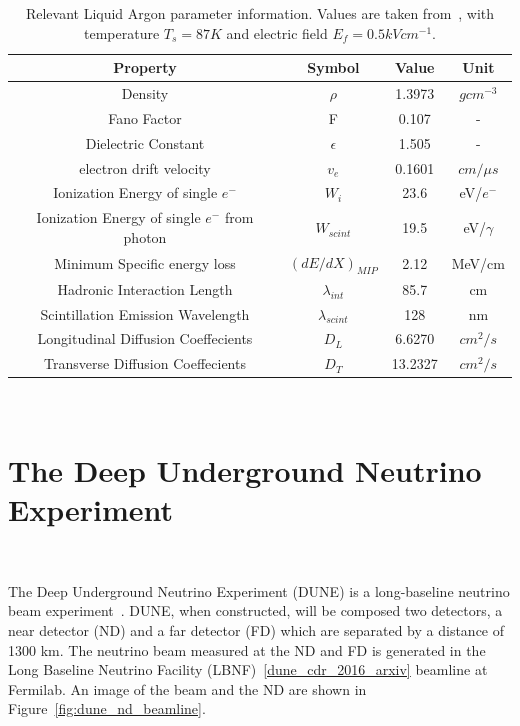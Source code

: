 \begin{table}
  \begin{center}
    \begin{tabular}{||c c c c||}
 \hline
      Property & Symbol & Value & Unit \\
 \hline\hline
      Density & $\rho$ &  1.3973 & $g cm^{-3}$ \\
      Fano Factor & F & 0.107 & - \\
      Dielectric Constant & $\epsilon$ & 1.505 & - \\
      electron drift velocity & $v_{e}$ & 0.1601 & $\unit{cm/\mu s}$ \\
      Ionization Energy of single $e^{-}$ & $W_{i}$ & 23.6 & eV/$e^{-}$ \\
      Ionization Energy of single $e^{-}$ from photon & $W_{scint}$ & 19.5 & eV/$\gamma$ \\
      Minimum Specific energy loss & $(dE/dX)_{MIP}$ & 2.12 & MeV/cm \\
      Hadronic Interaction Length & $\lambda_{int}$ &85.7 & cm \\
      Scintillation Emission Wavelength & $\lambda_{scint}$ & 128 & nm \\
      Longitudinal Diffusion Coeffecients & $D_{L}$ & 6.6270 & $cm^{2}/s$ \\
      Transverse Diffusion Coeffecients & $D_{T}$ & 13.2327 & $cm^{2}/s$ \\
 \hline
    \end{tabular}
    \caption{
      Relevant Liquid Argon parameter information.
      Values are taken from~\citep{lardata_lbnl}, with temperature $T_{s} = 87 K$ and electric field $E_{f} = 0.5 kV cm^{-1}$.}
  \end{center}
\end{table}~\label{tab:lar_prop}

\section{The Deep Underground Neutrino Experiment}~\label{sec:dune}

The Deep Underground Neutrino Experiment (DUNE) is a long-baseline neutrino beam experiment~\citep{DUNE_TDR_V1_Abi_2020, DUNE_FD_TDRv2_2020, DUNE_TDRv3_Abi_2020, DUNE-FD_TDRv4:Abi_2020}.
DUNE, when constructed, will be composed two detectors, a near detector (ND) and a far detector (FD) which are separated by a distance of 1300 km.
The neutrino beam measured at the ND and FD is generated in the Long Baseline Neutrino Facility (LBNF)~\ref{dune_cdr_2016_arxiv} beamline at Fermilab.
An image of the beam and the ND are shown in Figure~\ref{fig:dune_nd_beamline}.

